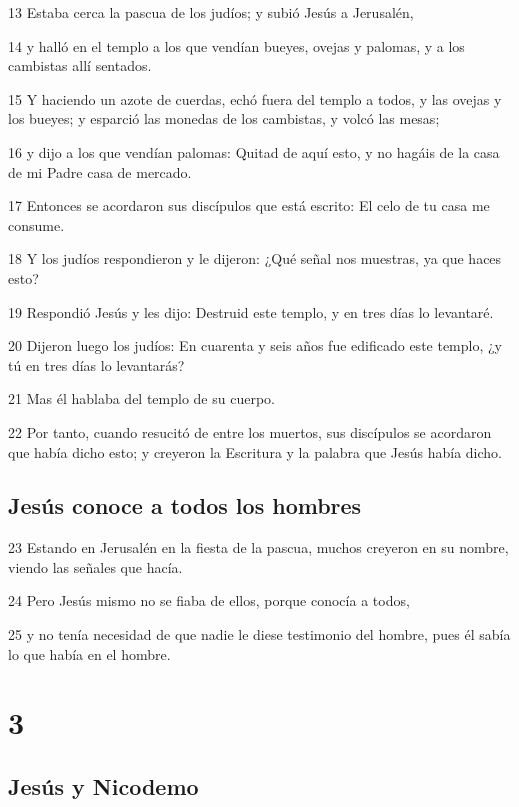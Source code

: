 \par 13 Estaba cerca la pascua de los judíos; y subió Jesús a Jerusalén,
\par 14 y halló en el templo a los que vendían bueyes, ovejas y palomas, y a los cambistas allí sentados.
\par 15 Y haciendo un azote de cuerdas, echó fuera del templo a todos, y las ovejas y los bueyes; y esparció las monedas de los cambistas, y volcó las mesas;
\par 16 y dijo a los que vendían palomas: Quitad de aquí esto, y no hagáis de la casa de mi Padre casa de mercado.
\par 17 Entonces se acordaron sus discípulos que está escrito: El celo de tu casa me consume.
\par 18 Y los judíos respondieron y le dijeron: ¿Qué señal nos muestras, ya que haces esto?
\par 19 Respondió Jesús y les dijo: Destruid este templo, y en tres días lo levantaré.
\par 20 Dijeron luego los judíos: En cuarenta y seis años fue edificado este templo, ¿y tú en tres días lo levantarás?
\par 21 Mas él hablaba del templo de su cuerpo.
\par 22 Por tanto, cuando resucitó de entre los muertos, sus discípulos se acordaron que había dicho esto; y creyeron la Escritura y la palabra que Jesús había dicho.

\section*{Jesús conoce a todos los hombres}

\par 23 Estando en Jerusalén en la fiesta de la pascua, muchos creyeron en su nombre, viendo las señales que hacía.
\par 24 Pero Jesús mismo no se fiaba de ellos, porque conocía a todos,
\par 25 y no tenía necesidad de que nadie le diese testimonio del hombre, pues él sabía lo que había en el hombre.

\chapter{3}

\section*{Jesús y Nicodemo}

